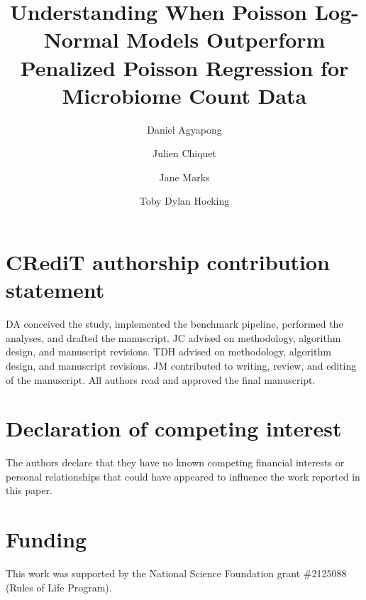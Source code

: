 \documentclass[preprint,12pt,authoryear]{elsarticle}
\begin{document}
\begin{frontmatter}

\title{Understanding When Poisson Log-Normal Models Outperform Penalized Poisson Regression for Microbiome Count Data}

\author[aff1]{Daniel Agyapong}
\author[aff2]{Julien Chiquet}
\author[aff3]{Jane Marks}
\author[aff4]{Toby Dylan Hocking}



\end{frontmatter}

\section*{CRediT authorship contribution statement}
DA conceived the study, implemented the benchmark pipeline, performed the analyses, and drafted the manuscript.
JC advised on methodology, algorithm design, and manuscript revisions.
TDH advised on methodology, algorithm design, and manuscript revisions.
JM contributed to writing, review, and editing of the manuscript.
All authors read and approved the final manuscript.

\section*{Declaration of competing interest}
The authors declare that they have no known competing financial interests or personal relationships that could have appeared to influence the work reported in this paper.

\section*{Funding}
This work was supported by the National Science Foundation grant \#2125088 (Rules of Life Program).
\end{document}

